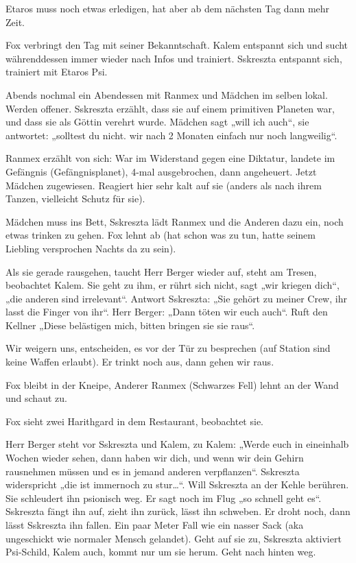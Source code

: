 \documentclass[11pt]{article}
\begin{document}
Etaros muss noch etwas erledigen, hat aber ab dem nächsten Tag dann mehr
Zeit.

Fox verbringt den Tag mit seiner Bekanntschaft. Kalem entspannt sich und
sucht währenddessen immer wieder nach Infos und trainiert. Sskreszta
entspannt sich, trainiert mit Etaros Psi.

Abends nochmal ein Abendessen mit Ranmex und Mädchen im selben lokal.
Werden offener. Sskreszta erzählt, dass sie auf einem primitiven
Planeten war, und dass sie als Göttin verehrt wurde. Mädchen sagt „will
ich auch``, sie antwortet: „solltest du nicht. wir nach 2 Monaten
einfach nur noch langweilig``.

Ranmex erzählt von sich: War im Widerstand gegen eine Diktatur, landete
im Gefängnis (Gefängnisplanet), 4-mal ausgebrochen, dann angeheuert.
Jetzt Mädchen zugewiesen. Reagiert hier sehr kalt auf sie (anders als
nach ihrem Tanzen, vielleicht Schutz für sie).

Mädchen muss ins Bett, Sskreszta lädt Ranmex und die Anderen dazu ein,
noch etwas trinken zu gehen. Fox lehnt ab (hat schon was zu tun, hatte
seinem Liebling versprochen Nachts da zu sein).

Als sie gerade rausgehen, taucht Herr Berger wieder auf, steht am
Tresen, beobachtet Kalem. Sie geht zu ihm, er rührt sich nicht, sagt
„wir kriegen dich``, „die anderen sind irrelevant``. Antwort Sskreszta:
„Sie gehört zu meiner Crew, ihr lasst die Finger von ihr``. Herr Berger:
„Dann töten wir euch auch``. Ruft den Kellner „Diese belästigen mich,
bitten bringen sie sie raus``.

Wir weigern uns, entscheiden, es vor der Tür zu besprechen (auf Station
sind keine Waffen erlaubt). Er trinkt noch aus, dann gehen wir raus.

Fox bleibt in der Kneipe, Anderer Ranmex (Schwarzes Fell) lehnt an der
Wand und schaut zu.

Fox sieht zwei Harithgard in dem Restaurant, beobachtet sie.

Herr Berger steht vor Sskreszta und Kalem, zu Kalem: „Werde euch in
eineinhalb Wochen wieder sehen, dann haben wir dich, und wenn wir dein
Gehirn rausnehmen müssen und es in jemand anderen verpflanzen``.
Sskreszta widerspricht „die ist immernoch zu stur\ldots{}``. Will
Sskreszta an der Kehle berühren. Sie schleudert ihn psionisch weg. Er
sagt noch im Flug „so schnell geht es``. Sskreszta fängt ihn auf, zieht
ihn zurück, lässt ihn schweben. Er droht noch, dann lässt Sskreszta ihn
fallen. Ein paar Meter Fall wie ein nasser Sack (aka ungeschickt wie
normaler Mensch gelandet). Geht auf sie zu, Sskreszta aktiviert
Psi-Schild, Kalem auch, kommt nur um sie herum. Geht nach hinten weg.
\end{document}
